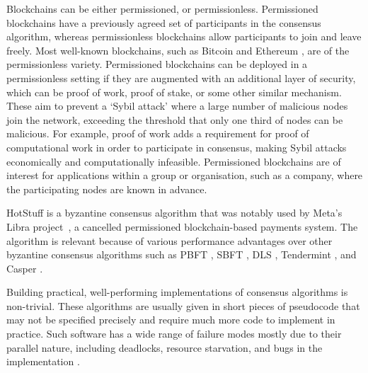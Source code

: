 Blockchains can be either permissioned, or permissionless. Permissioned blockchains have a previously agreed set of participants in the consensus algorithm, whereas permissionless blockchains allow participants to join and leave freely. Most well-known blockchains, such as Bitcoin \cite{nakamotoBitcoinPeertoPeerElectronic2008} and Ethereum \cite{ethereumWhite, ethereumYellow}, are of the permissionless variety. Permissioned blockchains can be deployed in a permissionless setting if they are augmented with an additional layer of security, which can be proof of work, proof of stake, or some other similar mechanism. These aim to prevent a `Sybil attack' where a large number of malicious nodes join the network, exceeding the threshold that only one third of nodes can be malicious. For example, proof of work adds a requirement for proof of computational work in order to participate in consensus, making Sybil attacks economically and computationally infeasible. Permissioned blockchains are of interest for applications within a group or organisation, such as a company, where the participating nodes are known in advance.

HotStuff is a byzantine consensus algorithm that was notably used by Meta's Libra \mbox{project \cite{baudetStateMachineReplication2019}}, a cancelled permissioned blockchain-based payments system. The algorithm is relevant because of various performance advantages over other byzantine consensus algorithms such as PBFT \cite{castroPracticalByzantineFault1999}, SBFT \cite{golanguetaSBFTScalableDecentralized2019}, DLS \cite{dworkConsensusPresencePartial1988}, Tendermint \cite{kwonTendermintConsensusMining2014}, and Casper \cite{buterinCasperFriendlyFinality2019}.

Building practical, well-performing implementations of consensus algorithms is non-trivial. These algorithms are usually given in short pieces of pseudocode that may not be specified precisely and require much more code to implement in practice. Such software has a wide range of failure modes mostly due to their parallel nature, including deadlocks, resource starvation, and bugs in the implementation \cite{chandraPaxosMadeLive2007}.

